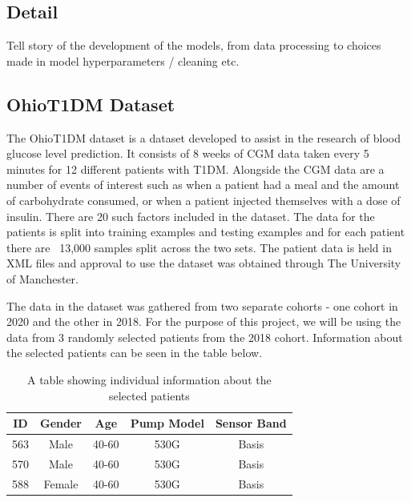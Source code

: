 	\subsection{Detail}
        Tell story of the development of the models, from data processing to choices made in model hyperparameters / cleaning etc.

      \subsection{OhioT1DM Dataset}
      The OhioT1DM \cite{ohio} dataset is a dataset developed to assist in the research of blood glucose level prediction. It consists of 8 weeks of CGM data taken every 5 minutes for 12 different patients with T1DM. Alongside the CGM data are a number of events of interest such as when a patient had a meal and the amount of carbohydrate consumed, or when a patient injected themselves with a dose of insulin. There are 20 such factors included in the dataset. The data for the patients is split into training examples and testing examples and for each patient there are ~13,000 samples split across the two sets. The patient data is held in XML files and approval to use the dataset was obtained through The University of Manchester.

      The data in the dataset was gathered from two separate cohorts - one cohort in 2020 and the other in 2018. For the purpose of this project, we will be using the data from 3 randomly selected patients from the 2018 cohort. Information about the selected patients can be seen in the table below.


      \begin{table}[H]
        \begin{center}
          \caption{A table showing individual information about the selected patients}
          \begin{tabular}{||c c c c c||} 
          \hline
          ID & Gender & Age & Pump Model & Sensor Band \\ [0.5ex] 
          \hline\hline
          563 & Male & 40-60 & 530G & Basis \\ 
          \hline
          570 & Male & 40-60 & 530G & Basis \\
          \hline
          588 & Female & 40-60 & 530G & Basis \\ [1ex]
          \hline 
          \end{tabular}
        \end{center}
      \end{table}

